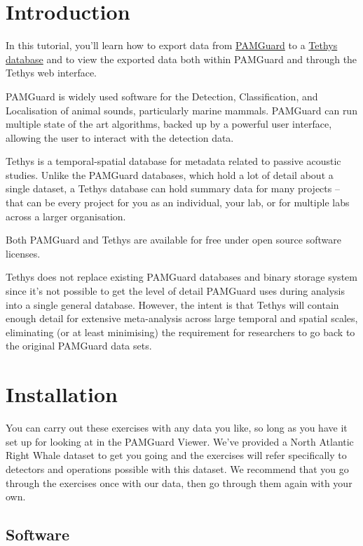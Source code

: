 \documentclass[
]{article}
\begin{document}
\section{Introduction}\label{introduction}

In this tutorial, you'll learn how to export data from
\href{https://www.pamguard.org}{PAMGuard} to a
\href{https://tethys.sdsu.edu}{Tethys database} and to view the exported
data both within PAMGuard and through the Tethys web interface.

PAMGuard is widely used software for the Detection, Classification, and
Localisation of animal sounds, particularly marine mammals. PAMGuard can
run multiple state of the art algorithms, backed up by a powerful user
interface, allowing the user to interact with the detection data.

Tethys is a temporal-spatial database for metadata related to passive
acoustic studies. Unlike the PAMGuard databases, which hold a lot of
detail about a single dataset, a Tethys database can hold summary data
for many projects -- that can be every project for you as an individual,
your lab, or for multiple labs across a larger organisation.

Both PAMGuard and Tethys are available for free under open source
software licenses.

Tethys does not replace existing PAMGuard databases and binary storage
system since it's not possible to get the level of detail PAMGuard uses
during analysis into a single general database. However, the intent is
that Tethys will contain enough detail for extensive meta-analysis
across large temporal and spatial scales, eliminating (or at least
minimising) the requirement for researchers to go back to the original
PAMGuard data sets.

\section{Installation}\label{installation}

You can carry out these exercises with any data you like, so long as you
have it set up for looking at in the PAMGuard Viewer. We've provided a
North Atlantic Right Whale dataset to get you going and the exercises
will refer specifically to detectors and operations possible with this
dataset. We recommend that you go through the exercises once with our
data, then go through them again with your own.

\subsection{Software}\label{software}
\end{document}
